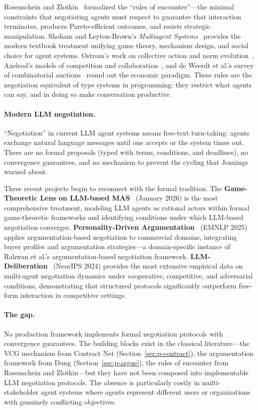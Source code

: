 \documentclass{article}
\begin{document}
Rosenschein and Zlotkin~\citep{rosenschein1994rules} formalized the ``rules of
encounter''---the minimal constraints that negotiating agents must respect to guarantee
that interaction terminates, produces Pareto-efficient outcomes, and resists strategic
manipulation. Shoham and Leyton-Brown's
\emph{Multiagent Systems}~\citep{sutra13943_multiagent2009} provides the modern
textbook treatment unifying game theory, mechanism design, and social choice for agent
systems. Ostrom's work on collective action and norm
evolution~\citep{sutra19493_collective2000}, Axelrod's models of competition and
collaboration~\citep{sutra14993_complexity1998}, and de Weerdt et al.'s survey of
combinatorial auctions~\citep{sutra18290_combinatorial2003} round out the economic
paradigm. These rules are the negotiation equivalent of type systems in programming:
they restrict what agents can say, and in doing so make conversation productive.

\paragraph{Modern LLM negotiation.}
``Negotiation'' in current LLM agent systems means free-text turn-taking: agents exchange
natural language messages until one accepts or the system times out. There are no formal
proposals (typed with terms, conditions, and deadlines), no convergence guarantees, and
no mechanism to prevent the cycling that Jennings warned about.

Three recent projects begin to reconnect with the formal tradition.
The \textbf{Game-Theoretic Lens on LLM-based MAS}~\citep{gametheolens2026} (January
2026) is the most comprehensive treatment, modeling LLM agents as rational actors within
formal game-theoretic frameworks and identifying conditions under which LLM-based
negotiation converges.
\textbf{Personality-Driven Argumentation}~\citep{personalityarg2025} (EMNLP 2025)
applies argumentation-based negotiation to commercial domains, integrating buyer
profiles and argumentation strategies---a domain-specific instance of Rahwan et al.'s
argumentation-based negotiation framework.
\textbf{LLM-Deliberation}~\citep{llmdeliberation2024} (NeurIPS 2024) provides the most
extensive empirical data on multi-agent negotiation dynamics under cooperative,
competitive, and adversarial conditions, demonstrating that structured protocols
significantly outperform free-form interaction in competitive settings.

\paragraph{The gap.}
No production framework implements formal negotiation protocols with convergence
guarantees. The building blocks exist in the classical literature---the VCG mechanism
from Contract Net (Section~\ref{sec:p-contract}), the argumentation framework from Dung
(Section~\ref{sec:p-argue}), the rules of encounter from Rosenschein and Zlotkin---but
they have not been composed into implementable LLM negotiation protocols. The absence
is particularly costly in multi-stakeholder agent systems where agents represent
different users or organizations with genuinely conflicting objectives.
\end{document}
